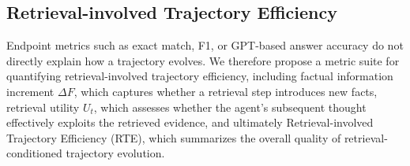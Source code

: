 \documentclass{article} %
\begin{document}



\subsection{Retrieval-involved Trajectory Efficiency}
Endpoint metrics such as exact match, F1, or GPT-based answer accuracy do not directly explain how a trajectory evolves. 
We therefore propose a metric suite for quantifying retrieval-involved trajectory efficiency, including factual information increment $\Delta F$, which captures whether a retrieval step introduces new facts, retrieval utility $U_t$, which assesses whether the agent's subsequent thought effectively exploits the retrieved evidence, and ultimately Retrieval-involved Trajectory Efficiency (RTE), which summarizes the overall quality of retrieval-conditioned trajectory evolution.
\end{document}
